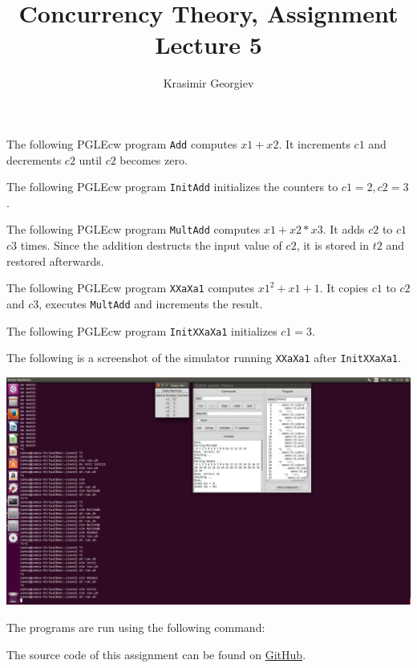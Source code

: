 \documentclass[a4paper]{article}
\title{Concurrency Theory, Assignment Lecture 5}
\author{Krasimir Georgiev}
\newcommand{\prog}[1]{\texttt{#1}}
\begin{document}
\maketitle

The following PGLEcw program \prog{Add} computes $x1 + x2$.
It increments $c1$ and decrements $c2$ until $c2$ becomes zero.


The following PGLEcw program \prog{InitAdd} initializes the counters to
$c1 = 2, c2 = 3$.


The following PGLEcw program \prog{MultAdd} computes $x1 + x2 * x3$.
It adds $c2$ to $c1$ $c3$ times. Since the addition destructs the input value
of $c2$, it is stored in $t2$ and restored afterwards.


The following PGLEcw program \prog{XXaXa1} computes $x1^2 + x1 + 1$.
It copies $c1$ to $c2$ and $c3$, executes \prog{MultAdd} and increments the
result.


The following PGLEcw program \prog{InitXXaXa1} initializes $c1 = 3$.


The following is a screenshot of the simulator running \prog{XXaXa1} after
\prog{InitXXaXa1}.

\includegraphics[scale=0.2]{assignment.png}

The programs are run using the following command:


The source code of this assignment can be found on
\href{https://github.com/comco/concurrency-theory-assignments/tree/master/assignment-lecture-5}{GitHub}.
\end{document}
